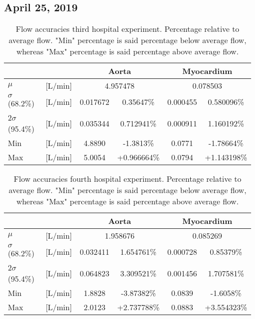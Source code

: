 \subsection*{April 25, 2019}
\begin{table}[H]
\caption{Flow accuracies third hospital experiment. Percentage relative to average flow. "Min" percentage is said percentage below average flow, whereas "Max" percentage is said percentage above average flow.}
\label{tab:hospital_third}
\begin{tabular}{lc|cccc|}
					&    		& \multicolumn{2}{c}{Aorta} 					& \multicolumn{2}{c}{Myocardium} 		\\ \hline
$\mu$		& [L/min]   & \multicolumn{2}{c}{4.957478 } & \multicolumn{2}{c|}{0.078503} \\
$\sigma$ (68.2\%) 	& [L/min]	& 0.017672 & 0.35647\%		& 0.000455 & 0.580096\%                          	\\
2$\sigma$ (95.4\%) 	& [L/min] 	& 0.035344 & 0.712941\%		& 0.000911 &  1.160192\%                         				\\
Min 				& [L/min]  	& 4.8890 & -1.3813\% &  0.0771 & -1.78664\% \\
Max 				& [L/min]	& 5.0054 & +0.966664\%  & 0.0794 & +1.143198\% \\ \cline{3-6} 
\end{tabular}
\end{table}

\begin{table}[H]
\caption{Flow accuracies fourth hospital experiment. Percentage relative to average flow. "Min" percentage is said percentage below average flow, whereas "Max" percentage is said percentage above average flow.}
\label{tab:hospital_fourth}
\begin{tabular}{lc|cccc|}
					&    		& \multicolumn{2}{c}{Aorta} 					& \multicolumn{2}{c}{Myocardium} 		\\ \hline
$\mu$ 		& [L/min]   & \multicolumn{2}{c}{1.958676 } & \multicolumn{2}{c|}{0.085269} \\
$\sigma$ (68.2\%) 	& [L/min]	& 0.032411 & 1.654761\%		& 0.000728 & 0.85379\%                          	\\
2$\sigma$ (95.4\%) 	& [L/min] 	& 0.064823 & 3.309521\%		& 0.001456 &  1.707581\%                         				\\
Min 				& [L/min]  	& 1.8828 & -3.87382\% &  0.0839 & -1.6058\% \\
Max 				& [L/min]	& 2.0123 & +2.737788\%  & 0.0883 & +3.554323\% \\ \cline{3-6} 
\end{tabular}
\end{table}

